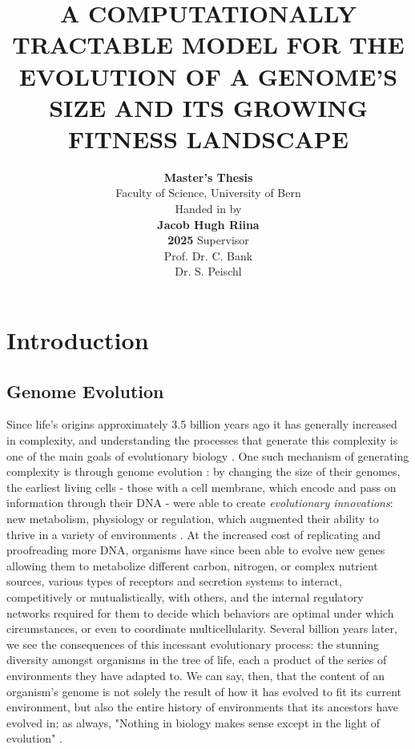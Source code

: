 \documentclass[paper=a4, fontsize=11pt,twoside]{scrartcl}       %
\title{
                        \LARGE \textbf{\uppercase{A Computationally Tractable Model for the Evolution of a Genome's Size and its Growing Fitness Landscape}}      %
                }
\author{
                \textbf{Master's Thesis}\\
                Faculty of Science, University of Bern\\
                \vspace{1cm}
                Handed in by \\
                \textbf{Jacob Hugh Riina} \\
		\vspace{2cm}
		\textbf{2025}
                \vfill
                Supervisor\\
                Prof. Dr. C. Bank\\
                Dr. S. Peischl\\
}
\makeatletter
\def\printtitle{%
    {\centering \@title\par}}
\def\printauthor{%
    {\centering \large \@author}}
\makeatother
\begin{document}

\thispagestyle{empty}           %

\printtitle                                     %
        \vfill
\printauthor                            %
\newpage


\setcounter{page}{1}            %

\section*{Introduction}

\subsection*{Genome Evolution}

Since life's origins approximately 3.5 billion years ago it has generally increased in complexity, and understanding the processes that generate this complexity is one of the main goals of evolutionary biology \cite{duclosInvestigatingEvolutionDevelopment2019}\cite{mcshea2010biology}. One such mechanism of generating complexity is through genome evolution \cite{lynchOriginsGenomeComplexity2003}: by changing the size of their genomes, the earliest living cells - those with a cell membrane, which encode and pass on information through their DNA - were able to create \textit{evolutionary innovations}\cite{wagnerMolecularOriginsEvolutionary2011}: new metabolism, physiology or regulation, which augmented their ability to thrive in a variety of environments \cite{barveLatentCapacityEvolutionary2013}\cite{uebbingEvolutionaryInnovationsConserved2024}. At the increased cost of replicating and proofreading more DNA, organisms have since been able to evolve new genes allowing them to metabolize different carbon, nitrogen, or complex nutrient sources, various types of receptors and secretion systems to interact, competitively or mutualistically, with others, and the internal regulatory networks required for them to decide which behaviors are optimal under which circumstances, or even to coordinate multicellularity. Several billion years later, we see the consequences of this incessant evolutionary process: the stunning diversity amongst organisms in the tree of life, each a product of the series of environments they have adapted to. We can say, then, that the content of an organism's genome is not solely the result of how it has evolved to fit its current environment, but also the entire history of environments that its ancestors have evolved in; as always, "Nothing in biology makes sense except in the light of evolution" \cite{dobzhanskyBIOLOGYMOLECULARORGANISMIC1964}.
\end{document}
